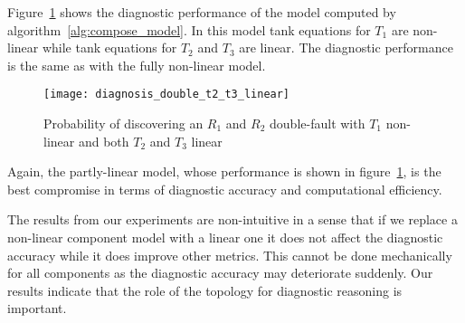 \par
Figure~\ref{fig:diagnosis_double_t2_t3_linear} shows the diagnostic
performance of the model computed by
algorithm~\ref{alg:compose_model}. In this model tank equations for
$T_1$ are non-linear while tank equations for $T_2$ and $T_3$ are
linear. The diagnostic performance is the same as with the fully
non-linear model.
%
\begin{figure}[htb]
  \centering
  \texttt{[image: diagnosis\_double\_t2\_t3\_linear]}
  \caption{Probability of discovering an $R_1$ and $R_2$ double-fault with $T_1$ non-linear and both $T_2$ and $T_3$ linear}
  \label{fig:diagnosis_double_t2_t3_linear}
\end{figure}
\par
%
Again, the partly-linear model, whose performance is shown in
figure~\ref{fig:diagnosis_double_t2_t3_linear}, is the best
compromise in terms of diagnostic accuracy and computational
efficiency.
\par
The results from our experiments are non-intuitive in a sense that
if we replace a non-linear component model with a linear one it does
not affect the diagnostic accuracy while it does improve other
metrics. This cannot be done mechanically for all components as the
diagnostic accuracy may deteriorate suddenly. Our results indicate
that the role of the topology for diagnostic reasoning is important.
